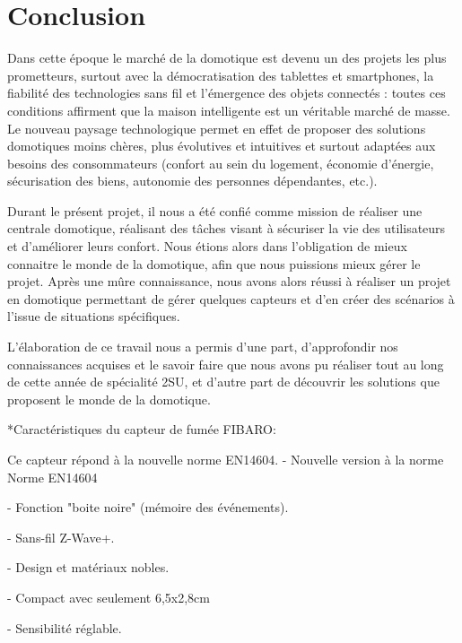 \newpage
\chapter{Conclusion}
Dans cette époque le marché de la domotique est devenu un des projets les plus prometteurs, surtout avec la démocratisation des tablettes et smartphones, la fiabilité des technologies sans fil et l'émergence des objets connectés : toutes ces conditions affirment que la maison intelligente est un véritable marché de masse. Le nouveau paysage technologique permet en effet de proposer des solutions domotiques moins chères, plus évolutives et intuitives et surtout adaptées aux besoins des consommateurs (confort au sein du logement, économie d'énergie, sécurisation des biens, autonomie des personnes dépendantes, etc.).\newline

Durant le présent projet, il nous a été confié comme mission de réaliser une centrale domotique, réalisant des tâches visant à sécuriser la vie des utilisateurs et d'améliorer leurs confort. Nous étions alors dans l'obligation de mieux connaitre le monde de la domotique, afin que nous puissions mieux gérer le projet. Après une mûre connaissance, nous avons alors réussi à réaliser un projet en domotique permettant de gérer quelques capteurs et d'en créer des scénarios à l'issue de situations spécifiques.\newline

L'élaboration de ce travail nous a permis d'une part, d'approfondir nos connaissances acquises et le savoir faire que nous avons pu réaliser tout au long de cette année de spécialité 2SU, et d'autre part de découvrir les solutions que proposent le monde de la domotique.\newline

\newpage

\listoffigures

\newpage

*Caractéristiques du capteur de fumée FIBARO:

 
Ce capteur répond à la nouvelle norme EN14604. -    Nouvelle version à la norme Norme EN14604


-    Fonction "boite noire" (mémoire des événements).


-    Sans-fil Z-Wave+.


-    Design et matériaux nobles.


-    Compact avec seulement 6,5x2,8cm


-    Sensibilité réglable.


